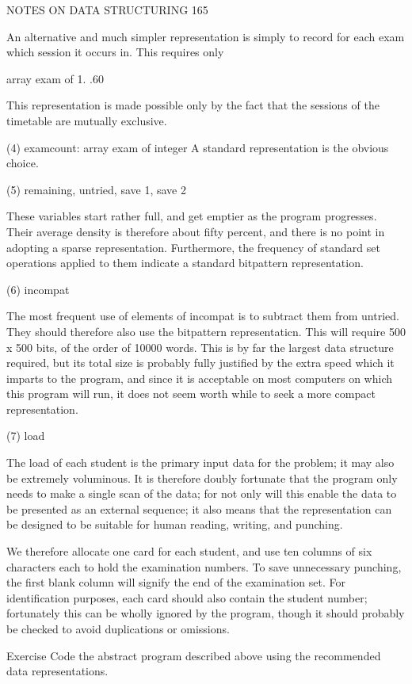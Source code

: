 NOTES ON DATA STRUCTURING 165

An alternative and much simpler representation is simply to record for each exam which session it occurs in. This requires only

array exam of 1. .60

This representation is made possible only by the fact that the sessions of the timetable are mutually exclusive.

(4) examcount: array exam of integer A standard representation is the obvious choice.

(5) remaining, untried, save 1, save 2

These variables start rather full, and get emptier as the program progresses. Their average density is therefore about fifty percent, and there is no point in adopting a sparse representation. Furthermore, the frequency of standard set operations applied to them indicate a standard bitpattern representation.

(6) incompat

The most frequent use of elements of incompat is to subtract them from untried. They should therefore also use the bitpattern representaticn. This will require 500 x 500 bits, of the order of 10000 words. This is by far the largest data structure required, but its total size is probably fully justified by the extra speed which it imparts to the program, and since it is acceptable on most computers on which this program will run, it does not seem worth while to seek a more compact representation.

(7) load

The load of each student is the primary input data for the problem; it may also be extremely voluminous. It is therefore doubly fortunate that the program only needs to make a single scan of the data; for not only will this enable the data to be presented as an external sequence; it also means that the representation can be designed to be suitable for human reading, writing, and punching.

We therefore allocate one card for each student, and use ten columns of six characters each to hold the examination numbers. To save unnecessary punching, the first blank column will signify the end of the examination set. For identification purposes, each card should also contain the student number; fortunately this can be wholly ignored by the program, though it should probably be checked to avoid duplications or omissions.

Exercise Code the abstract program described above using the recommended data representations.

